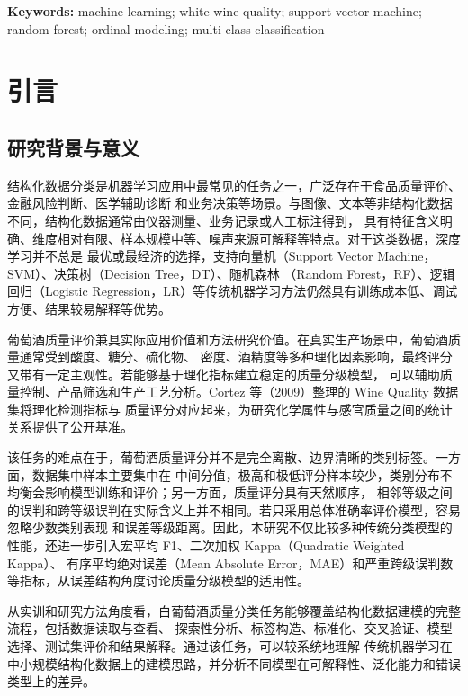 \documentclass[12pt,a4paper,fontset=fandol]{ctexart}
\numberwithin{figure}{section}
\numberwithin{table}{section}
\numberwithin{equation}{section}
\begin{document}
\par\vspace{1ex}
\noindent\textbf{Keywords:} machine learning; white wine quality; support vector machine; random forest; ordinal modeling; multi-class classification

\newpage
\tableofcontents
\clearpage
{}  %

\section{引言}

\subsection{研究背景与意义}
结构化数据分类是机器学习应用中最常见的任务之一，广泛存在于食品质量评价、金融风险判断、医学辅助诊断
和业务决策等场景。与图像、文本等非结构化数据不同，结构化数据通常由仪器测量、业务记录或人工标注得到，
具有特征含义明确、维度相对有限、样本规模中等、噪声来源可解释等特点。对于这类数据，深度学习并不总是
最优或最经济的选择，支持向量机（Support Vector Machine，SVM）、决策树（Decision Tree，DT）、随机森林
（Random Forest，RF）、逻辑回归（Logistic Regression，LR）等传统机器学习方法仍然具有训练成本低、调试
方便、结果较易解释等优势。

葡萄酒质量评价兼具实际应用价值和方法研究价值。在真实生产场景中，葡萄酒质量通常受到酸度、糖分、硫化物、
密度、酒精度等多种理化因素影响，最终评分又带有一定主观性。若能够基于理化指标建立稳定的质量分级模型，
可以辅助质量控制、产品筛选和生产工艺分析。Cortez 等（2009）整理的 Wine Quality 数据集将理化检测指标与
质量评分对应起来，为研究化学属性与感官质量之间的统计关系提供了公开基准。

该任务的难点在于，葡萄酒质量评分并不是完全离散、边界清晰的类别标签。一方面，数据集中样本主要集中在
中间分值，极高和极低评分样本较少，类别分布不均衡会影响模型训练和评价；另一方面，质量评分具有天然顺序，
相邻等级之间的误判和跨等级误判在实际含义上并不相同。若只采用总体准确率评价模型，容易忽略少数类别表现
和误差等级距离。因此，本研究不仅比较多种传统分类模型的性能，还进一步引入宏平均 F1、二次加权 Kappa（Quadratic Weighted Kappa）、
有序平均绝对误差（Mean Absolute Error，MAE）和严重跨级误判数等指标，从误差结构角度讨论质量分级模型的适用性。

从实训和研究方法角度看，白葡萄酒质量分类任务能够覆盖结构化数据建模的完整流程，包括数据读取与查看、
探索性分析、标签构造、标准化、交叉验证、模型选择、测试集评价和结果解释。通过该任务，可以较系统地理解
传统机器学习在中小规模结构化数据上的建模思路，并分析不同模型在可解释性、泛化能力和错误类型上的差异。
\end{document}
